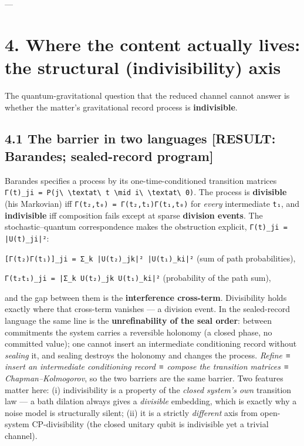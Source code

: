 \documentclass[11pt]{article}
\begin{document}
---

\section*{4. Where the content actually lives: the structural (indivisibility) axis}
The quantum-gravitational question that the reduced channel cannot answer is whether the matter's gravitational record process is \textbf{indivisible}.

\subsection*{4.1 The barrier in two languages [RESULT: Barandes; sealed-record program]}
Barandes specifies a process by its one-time-conditioned transition matrices \texttt{Γ(t)\_{ji} = P(j\textbackslash{} \textbackslash{}text{at}\textbackslash{} t \textbackslash{}mid i\textbackslash{} \textbackslash{}text{at}\textbackslash{} 0)}. The process is \textbf{divisible} (his Markovian) iff \texttt{Γ(t₂,t₀) = Γ(t₂,t₁)Γ(t₁,t₀)} for \emph{every} intermediate \texttt{t₁}, and \textbf{indivisible} iff composition fails except at sparse \textbf{division events}. The stochastic–quantum correspondence makes the obstruction explicit, \texttt{Γ(t)\_{ji} = |U(t)\_{ji}|²}:

\texttt{[Γ(t₂)Γ(t₁)]\_{ji} = Σ\_k |U(t₂)\_{jk}|² |U(t₁)\_{ki}|²}  (sum of path probabilities),

\texttt{Γ(t₂t₁)\_{ji} = |Σ\_k U(t₂)\_{jk} U(t₁)\_{ki}|²}  (probability of the path sum),

and the gap between them is the \textbf{interference cross-term}. Divisibility holds exactly where that cross-term vanishes — a division event. In the sealed-record language the same line is the \textbf{unrefinability of the seal order}: between commitments the system carries a reversible holonomy (a closed phase, no committed value); one cannot insert an intermediate conditioning record without \emph{sealing} it, and sealing destroys the holonomy and changes the process. \emph{Refine ≡ insert an intermediate conditioning record ≡ compose the transition matrices ≡ Chapman–Kolmogorov}, so the two barriers are the same barrier. Two features matter here: (i) indivisibility is a property of the \emph{closed system's own} transition law — a bath dilation always gives a \emph{divisible} embedding, which is exactly why a noise model is structurally silent; (ii) it is a strictly \emph{different} axis from open-system CP-divisibility (the closed unitary qubit is indivisible yet a trivial channel).
\end{document}
